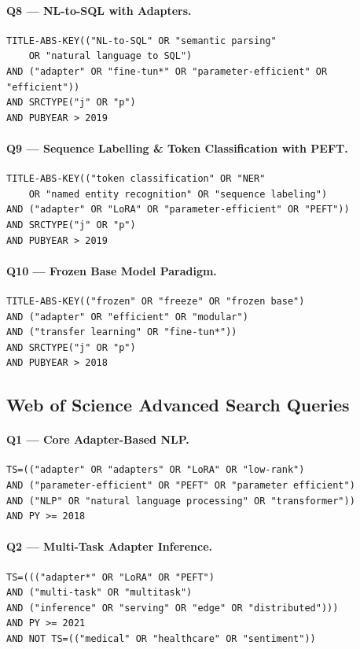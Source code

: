 \paragraph{Q8 — NL-to-SQL with Adapters.}
\begin{verbatim}
TITLE-ABS-KEY(("NL-to-SQL" OR "semantic parsing"
    OR "natural language to SQL")
AND ("adapter" OR "fine-tun*" OR "parameter-efficient" OR "efficient"))
AND SRCTYPE("j" OR "p")
AND PUBYEAR > 2019
\end{verbatim}

\paragraph{Q9 — Sequence Labelling \& Token Classification with PEFT.}
\begin{verbatim}
TITLE-ABS-KEY(("token classification" OR "NER"
    OR "named entity recognition" OR "sequence labeling")
AND ("adapter" OR "LoRA" OR "parameter-efficient" OR "PEFT"))
AND SRCTYPE("j" OR "p")
AND PUBYEAR > 2019
\end{verbatim}

\paragraph{Q10 — Frozen Base Model Paradigm.}
\begin{verbatim}
TITLE-ABS-KEY(("frozen" OR "freeze" OR "frozen base")
AND ("adapter" OR "efficient" OR "modular")
AND ("transfer learning" OR "fine-tun*"))
AND SRCTYPE("j" OR "p")
AND PUBYEAR > 2018
\end{verbatim}

\subsection*{Web of Science Advanced Search Queries}
\label{app:db_queries:wos}

\paragraph{Q1 — Core Adapter-Based NLP.}
\begin{verbatim}
TS=(("adapter" OR "adapters" OR "LoRA" OR "low-rank")
AND ("parameter-efficient" OR "PEFT" OR "parameter efficient")
AND ("NLP" OR "natural language processing" OR "transformer"))
AND PY >= 2018
\end{verbatim}

\paragraph{Q2 — Multi-Task Adapter Inference.}
\begin{verbatim}
TS=((("adapter*" OR "LoRA" OR "PEFT")
AND ("multi-task" OR "multitask")
AND ("inference" OR "serving" OR "edge" OR "distributed")))
AND PY >= 2021
AND NOT TS=(("medical" OR "healthcare" OR "sentiment"))
\end{verbatim}

